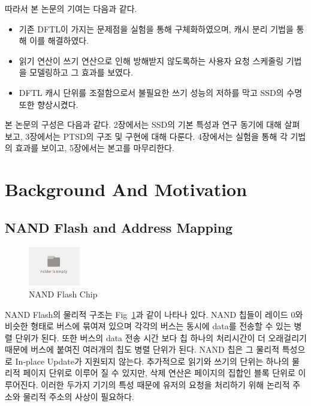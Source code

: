 \documentclass[conference]{IEEEtran}
\begin{document}
따라서 본 논문의 기여는 다음과 같다.
\begin{itemize}
	\item{기존 DFTL이 가지는 문제점을 실험을 통해 구체화하였으며, 캐시 분리 기법을 통해 이를 해결하였다.}
	\item{읽기 연산이 쓰기 연산으로 인해 방해받지 않도록하는 사용자 요청 스케줄링 기법을 모델링하고 그 효과를 보였다.}
	\item{DFTL 캐시 단위를 조절함으로서 불필요한 쓰기 성능의 저하를 막고 SSD의 수명 또한 향상시켰다.}
\end{itemize}
\par

본 논문의 구성은 다음과 같다. 2장에서는 SSD의 기본 특성과 연구 동기에 대해 살펴보고, 3장에서는 PTSD의 구조 및
구현에 대해 다룬다. 4장에서는 실험을 통해 각 기법의 효과를 보이고, 5장에서는 본고를 마무리한다.


\section{Background And Motivation}
\subsection{NAND Flash and Address Mapping}
\begin{figure}[h]
	\centering
	\includegraphics[width=0.2\textwidth]{image/bg.png}
	\caption{NAND Flash Chip}
	\label{fig:chips}
\end{figure}

NAND Flash의 물리적 구조는 Fig~\ref{fig:chips}과 같이 나타나 있다. NAND 칩들이 레이드 0와 비슷한
형태로 버스에 묶여져 있으며 각각의 버스는 동시에 data를 전송할 수 있는 병렬 단위가 된다.
또한 버스의 data 전송 시간 보다 칩 하나의 처리시간이 더 오래걸리기 때문에 버스에 붙여진 여러개의 칩도
병렬 단위가 된다. NAND 칩은 그 물리적 특성으로 In-place Update가 지원되지 않는다. 추가적으로
읽기와 쓰기의 단위는 하나의 물리적 페이지 단위로 이루어 질 수 있지만, 삭제 연산은 페이지의 집합인
블록 단위로 이루어진다. 이러한 두가지 기기의 특성 때문에 유저의 요청을 처리하기 위해
논리적 주소와 물리적 주소의 사상이 필요하다. \par
\end{document}
